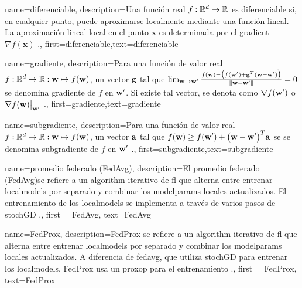 {{
{name={diferenciable},
	description={Una función real $f: \mathbb{R}^{d} \rightarrow \mathbb{R}$ 
		es diferenciable si, en cualquier punto, puede aproximarse localmente mediante una función lineal.
		La aproximación lineal local en el punto $\mathbf{x}$ es determinada por el 
		\gls{gradient} $\nabla f ( \mathbf{x})$ \cite{RudinBookPrinciplesMatheAnalysis}.},
	first={diferenciable},text={diferenciable} 
}

{name={gradiente},
	description={Para una función de valor real $f: \mathbb{R}^{d} \rightarrow \mathbb{R}: {\bf w} \mapsto f({\bf w})$, 
	un vector ${\bf g}$ tal que $\lim_{{\bf w} \rightarrow {\bf w}'} \frac{f({\bf w}) - \big(f({\bf w}')+ {\bf g}^{T} ({\bf w}- {\bf w}') \big) }{\| {\bf w}-{\bf w}'\|}=0$ 
	se denomina gradiente de $f$ en ${\bf w}'$. Si existe tal vector, se denota como
	$\nabla f({\bf w}')$ o $\nabla f({\bf w})\big|_{{\bf w}'}$ \cite{RudinBookPrinciplesMatheAnalysis}.},
	first={gradiente},text={gradiente} 
}

{name={subgradiente},
description={Para una función de valor real $f: \mathbb{R}^{d} \rightarrow \mathbb{R}: {\bf w} \mapsto f({\bf w})$, 
		un vector ${\bf a}$ tal que $f({\bf w}) \geq  f({\bf w}') +\big({\bf w}-{\bf w}' \big)^{T} {\bf a}$ se 
		se denomina subgradiente de $f$ en ${\bf w}'$ \cite{BertCvxAnalOpt,BertsekasNonLinProgr}.},
	first={subgradiente},text={subgradiente} 
}

{name={promedio federado (FedAvg)},
	description={El promedio federado (FedAvg)se refiere a un \gls{algorithm} iterativo de \gls{fl} que alterna entre entrenar \gls{localmodel}s por separado y combinar los \gls{modelparams} locales actualizados.
		El entrenamiento de los \gls{localmodel}s se implementa a través de varios pasos de \gls{stochGD} \cite{pmlr-v54-mcmahan17a}.}, 
		first = {FedAvg}, text={FedAvg} 
}

{name={FedProx},
	description={FedProx  se refiere a un \gls{algorithm} iterativo de \gls{fl} que alterna entre entrenar \gls{localmodel}s por separado y combinar los \gls{modelparams} locales actualizados. 
		A diferencia de \gls{fedavg}, que utiliza \gls{stochGD} para entrenar los \gls{localmodel}s, FedProx usa un \gls{proxop}  para el entrenamiento \cite{FedProx2020}.}, 
	first = {FedProx}, text={FedProx} 
}

}}
